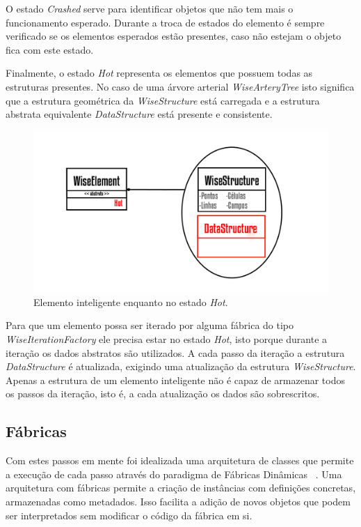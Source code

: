 \documentclass[
        english,			
        brazil			        %
        ,<...>]{abntbibufjf}
\begin{document}
O estado \textit{Crashed} serve para identificar objetos que não tem mais o funcionamento esperado. Durante a troca de estados do elemento é sempre verificado se os elementos esperados estão presentes, caso não estejam o objeto fica com este estado.

Finalmente, o estado \textit{Hot} representa os elementos que possuem todas as estruturas presentes. No caso de uma árvore arterial \textit{WiseArteryTree} isto significa que a estrutura geométrica da \textit{WiseStructure} está carregada e a estrutura abstrata equivalente \textit{DataStructure} está presente e consistente.

\begin{figure}[!htbp]
	\centering
	\includegraphics[scale=1]{Figures/WiseElementHot.png}
	\caption{Elemento inteligente enquanto no estado \textit{Hot}.}
	\label{fig6:wiseelementhot}
\end{figure}

Para que um elemento possa ser iterado por alguma fábrica do tipo \textit{WiseIterationFactory} ele precisa estar no estado \textit{Hot}, isto porque durante a iteração os dados abstratos são utilizados. A cada passo da iteração a estrutura \textit{DataStructure} é atualizada, exigindo uma atualização da estrutura \textit{WiseStructure}. Apenas a estrutura de um elemento inteligente não é capaz de armazenar todos os passos da iteração, isto é, a cada atualização os dados são sobrescritos.

\subsection{Fábricas}\label{sec:fabricas} 
 
Com estes passos em mente foi idealizada uma arquitetura de classes que permite a execução de cada passo através do paradigma de Fábricas Dinâmicas~ \cite{factorypattern}. Uma arquitetura com fábricas permite a criação de instâncias com definições concretas, armazenadas como metadados. Isso facilita a adição de novos objetos que podem ser interpretados sem modificar o código da fábrica em si.
\end{document}
